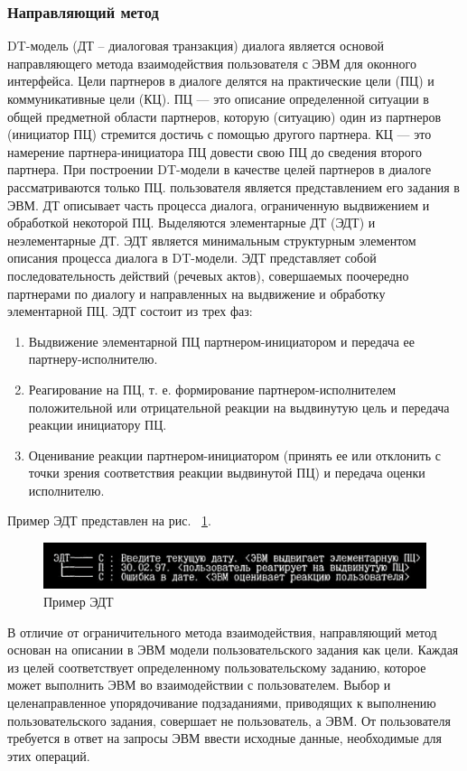 \subsubsection{Направляющий метод}
	DT-модель (ДТ – диалоговая транзакция) диалога является основой направляющего метода взаимодействия пользователя с ЭВМ для оконного интерфейса. 
	Цели партнеров в диалоге делятся на практические цели (ПЦ) и коммуникативные цели (КЦ). ПЦ — это описание определенной ситуации в общей предметной области партнеров, которую (ситуацию) один из партнеров (инициатор ПЦ) стремится достичь с помощью другого партнера. КЦ — это намерение партнера-инициатора ПЦ довести свою ПЦ до сведения второго партнера. При построении DT-модели в качестве целей партнеров в диалоге рассматриваются только ПЦ. пользователя является представлением его задания в ЭВМ. ДТ описывает часть процесса диалога, ограниченную выдвижением и обработкой некоторой ПЦ. Выделяются элементарные ДТ (ЭДТ) и неэлементарные ДТ. ЭДТ является минимальным структурным элементом описания процесса диалога в DT-модели. ЭДТ представляет собой последовательность действий (речевых актов), совершаемых поочередно партнерами по диалогу и направленных на выдвижение и обработку элементарной ПЦ. ЭДТ состоит из трех фаз:
\begin{enumerate}
	\item Выдвижение элементарной ПЦ партнером-инициатором и передача ее партнеру-исполнителю.
	\item Реагирование на ПЦ, т. е. формирование партнером-исполнителем положительной или отрицательной реакции на выдвинутую цель и передача реакции инициатору ПЦ.
	\item Оценивание реакции партнером-инициатором (принять ее или отклонить с точки зрения соответствия реакции выдвинутой ПЦ) и передача оценки исполнителю.
\end{enumerate}

	Пример ЭДТ представлен на рис. ~\ref{example}.
\begin{figure}[!ht]
  \centering
  \includegraphics[scale=0.8]{ResearchNotes/rndhpc_not_gui_2022_10_10/example.png}
  \caption{Пример ЭДТ}
  \label{example}
\end{figure}

	В отличие от ограничительного метода взаимодействия, направляющий метод основан на описании в ЭВМ модели пользовательского задания как цели. Каждая из целей соответствует определенному пользовательскому заданию, которое может выполнить ЭВМ во взаимодействии с пользователем. Выбор и целенаправленное упорядочивание подзаданиями, приводящих к выполнению пользовательского задания, совершает не пользователь, а ЭВМ. От пользователя требуется в ответ на запросы ЭВМ ввести исходные данные, необходимые для этих операций.

